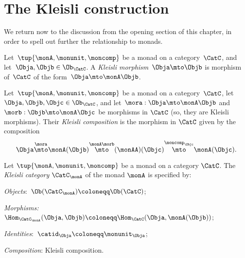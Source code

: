 

\section{The Kleisli construction}
\label{sec:Kleisli}

We return now to the discussion from the opening section of this chapter, in order to spell out further the relationship to monads. 


\begin{ctdefinition}
    \label{def:kleislimor}
Let~$\tup{\monA, \monunit, \moncomp}$ be a monad on a category~$\CatC$, and let~$\Obja, \Objb \in \Ob_\CatC$. A
\emph{Kleisli morphism}~$\Obja \mto \Objb$ is morphism of~$\CatC$ of the form~$\Obja \mto \monA \Objb$.
\end{ctdefinition}


\begin{ctdefinition}
    \label{def:kleislicomp}
Let~$\tup{\monA, \monunit, \moncomp}$ be a monad on a category~$\CatC$, let~$\Obja, \Objb, \Objc \in \Ob_\CatC$,  and let~$\mora : \Obja \mto \monA \Objb$ and $\morb : \Objb \mto \monA \Objc$ be morphisms in $\CatC$ (so, they are Kleisli morphisms). Their \emph{Kleisli composition} is the morphism in $\CatC$ given by the composition
\begin{equation}
\Obja \overset{\mora}{\mto} \monA(\Objb) \overset{\monA \morb}{\mto} (\monAA)(\Objc) \overset{\moncomp_\Objc}{\mto} \monA(\Objc).
\end{equation}
\end{ctdefinition}

\begin{ctdefinition}
    \label{def:kleislicat}
Let $\tup{\monA, \monunit, \moncomp}$ be a monad on a category $\CatC$. The \emph{Kleisli category} $\CatC_\monA$ of the monad $\monA$ is specified by:
\begin{compactenum}
\item \emph{Objects}:~$\Ob(\CatC_\monA) \coloneqq \Ob(\CatC)$;
\item \emph{Morphisms:}~$\Hom_{\CatC_\monA}(\Obja, \Objb) \coloneqq \Hom_{\CatC}(\Obja, \monA(\Objb))$;
\item \emph{Identities}:~$\catid_\Obja \coloneqq \monunit_\Obja$;
\item \emph{Composition}: Kleisli composition. 
\end{compactenum}
\end{ctdefinition}


